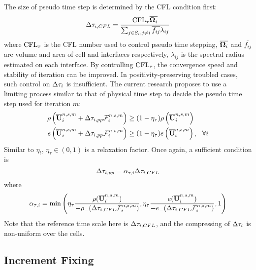 The size of pseudo time step is determined
by the CFL condition first:
\begin{equation}
    \mathrm\Delta \tau_{i,CFL} = \frac{\text{CFL}_\tau \overline{\mathbf{\Omega}_i} }
    {\sum_{j\in S_i, j\neq i}{\overline{f_{ij}}\lambda_{ij}}}
\end{equation}
where $\text{CFL}_\tau$ is the CFL number used to control
pseudo time stepping, $\overline{\mathbf{\Omega}_i}$ and $\overline{f_{ij}}$ 
are volume and area of cell and interfaces respectively, 
$\lambda_{ij}$ is the spectral radius estimated on each interface.
By controlling $\text{CFL}_\tau$, the convergence speed and 
stability of iteration can be improved. 
In positivity-preserving troubled cases, 
such control on $\mathrm\Delta \tau_i$ is insufficient.
The current research proposes to use a limiting 
process similar to that of physical time step 
to decide the pseudo time step used for 
iteration $m$:
\begin{equation}
    \label{eq:ppLimitDtau}
    \begin{aligned}
        \rho\left(\overline{\mathbf{U}}_i^{n,s,m} + \mathrm\Delta \tau_{i, pp}\mathcal{F}_i^{n,s,m}\right)
         & \geq
        (1- \eta_\tau)
        \rho\left(\overline{\mathbf{U}}_i^{n,s,m}\right) \\
        e\left(\overline{\mathbf{U}}_i^{n,s,m} + \mathrm\Delta \tau_{i, pp}\mathcal{F}_i^{n,s,m}\right)
         & \geq
        (1- \eta_\tau)
        e\left(\overline{\mathbf{U}}_i^{n,s,m}\right), \ \ \forall i
    \end{aligned}
\end{equation}
Similar to $\eta_t$, $\eta_\tau\in(0,1)$ is a relaxation factor. 
Once again, a sufficient condition is
\begin{equation}
    \mathrm\Delta\tau_{i,pp} =  \alpha_{\tau,i} \mathrm\Delta\tau_{i,CFL}
\end{equation}
where
\begin{equation}
    \alpha_{\tau,i} = \min\left(
        \eta_\tau\frac{\rho(\overline{\mathbf{U}}_i^{n,s,m})}{-\rho_-(\mathrm\Delta\tau_{i,CFL} \mathcal{F}_i^{n,s,m})},
        \eta_\tau\frac{e(\overline{\mathbf{U}}_i^{n,s,m})}{-e_-(\mathrm\Delta\tau_{i,CFL} \mathcal{F}_i^{n,s,m})},
        1
        \right)
\end{equation}
Note that the reference time scale here is $\mathrm\Delta\tau_{i,CFL}$, 
and the compressing of $\mathrm\Delta\tau_i$ is non-uniform over the cells.

\subsection{Increment Fixing}

